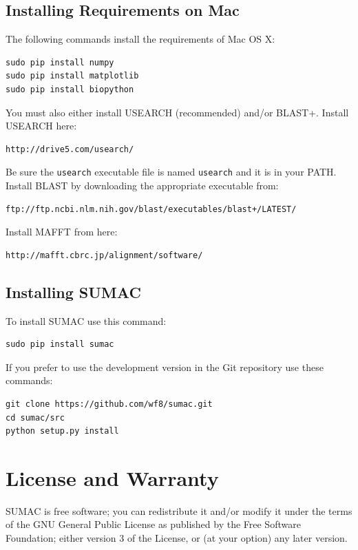\documentclass[10pt]{report}
\begin{document}
\subsection{Installing Requirements on Mac}

The following commands install the requirements of Mac OS X:

\begin{verbatim}
sudo pip install numpy
sudo pip install matplotlib
sudo pip install biopython
\end{verbatim}

You must also either install USEARCH (recommended) and/or BLAST+.
Install USEARCH here:

\begin{verbatim}
http://drive5.com/usearch/
\end{verbatim}
Be sure the \texttt{usearch} executable file is named
\texttt{usearch} and it is in your PATH.
Install BLAST by downloading the appropriate executable from:

\begin{verbatim}
ftp://ftp.ncbi.nlm.nih.gov/blast/executables/blast+/LATEST/
\end{verbatim}

Install MAFFT from here:

\begin{verbatim}
http://mafft.cbrc.jp/alignment/software/
\end{verbatim}


\subsection{Installing SUMAC}

To install SUMAC use this command:

\begin{verbatim}
sudo pip install sumac
\end{verbatim}

If you prefer to use the development version in the Git repository
use these commands:

\begin{verbatim}
git clone https://github.com/wf8/sumac.git
cd sumac/src
python setup.py install
\end{verbatim}

\section{License and Warranty}

SUMAC is free software; you can redistribute it and/or modify it under the terms of the GNU General Public License as published by the Free Software Foundation; either version 3 of the License, or (at your option) any later version.
\end{document}
